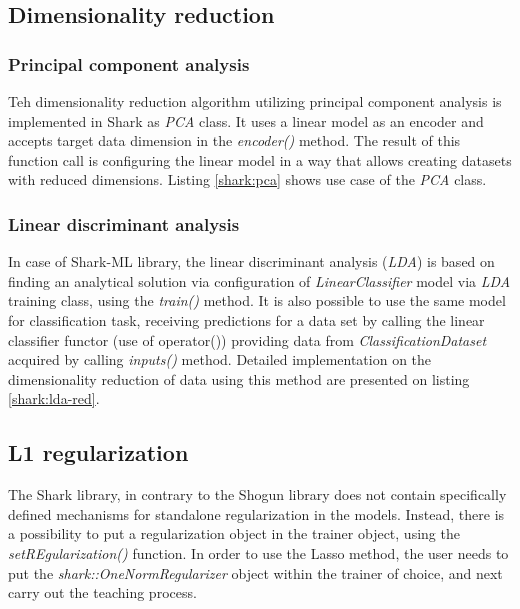 \subsection{Dimensionality reduction}
\subsubsection{Principal component analysis}

Teh dimensionality reduction algorithm utilizing principal component analysis is implemented in Shark as \textit{PCA} class. It uses a linear model as an encoder and accepts target data dimension in the \textit{encoder()} method. The result of this function call is configuring the linear model in a way that allows creating datasets with reduced dimensions. Listing \ref{shark:pca} shows use case of the \textit{PCA} class.


\subsubsection{Linear discriminant analysis}

In case of Shark-ML library, the linear discriminant analysis (\textit{LDA}) is based on finding an analytical solution via configuration of \textit{LinearClassifier} model via \textit{LDA} training class, using the \textit{train()} method. It is also possible to use the same model for classification task, receiving predictions for a data set by calling the linear classifier functor (use of operator()) providing data from \textit{ClassificationDataset} acquired by calling \textit{inputs()} method. Detailed implementation on the dimensionality reduction of data using this method are presented on listing \ref{shark:lda-red}.


\subsection{L1 regularization}

The Shark library, in contrary to the Shogun library does not contain specifically defined mechanisms for standalone regularization in the models. Instead, there is a possibility to put a regularization object in the trainer object, using the \textit{setREgularization()} function. In order to use the Lasso method, the user needs to put the \textit{shark::OneNormRegularizer} object within the trainer of choice, and next carry out the teaching process.

